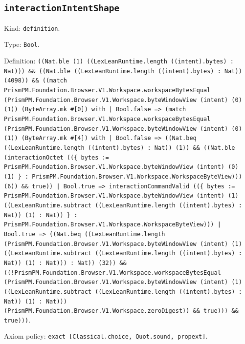 \documentclass[11pt]{article}
\begin{document}
\subsection*{\texttt{interactionIntentShape}}
\noindent Kind: \texttt{definition}.\par
\noindent Type: \texttt{Bool}.\par
\noindent Definition: \texttt{((Nat.ble (1) ((LexLeanRuntime.length ((intent).bytes) : Nat))) \&\& ((Nat.ble ((LexLeanRuntime.length ((intent).bytes) : Nat)) (4098)) \&\& ((match PrismPM.Foundation.Browser.V1.Workspace.workspaceBytesEqual (PrismPM.Foundation.Browser.V1.Workspace.byteWindowView (intent) (0) (1)) (ByteArray.mk \#[0]) with | Bool.false => (match PrismPM.Foundation.Browser.V1.Workspace.workspaceBytesEqual (PrismPM.Foundation.Browser.V1.Workspace.byteWindowView (intent) (0) (1)) (ByteArray.mk \#[4]) with | Bool.false => ((Nat.beq ((LexLeanRuntime.length ((intent).bytes) : Nat)) (1)) \&\& ((Nat.ble (interactionOctet ((\{ bytes := PrismPM.Foundation.Browser.V1.Workspace.byteWindowView (intent) (0) (1) \} : PrismPM.Foundation.Browser.V1.Workspace.WorkspaceByteView))) (6)) \&\& true)) | Bool.true => interactionCommandValid ((\{ bytes := PrismPM.Foundation.Browser.V1.Workspace.byteWindowView (intent) (1) ((LexLeanRuntime.subtract ((LexLeanRuntime.length ((intent).bytes) : Nat)) (1) : Nat)) \} : PrismPM.Foundation.Browser.V1.Workspace.WorkspaceByteView))) | Bool.true => ((Nat.beq ((LexLeanRuntime.length (PrismPM.Foundation.Browser.V1.Workspace.byteWindowView (intent) (1) ((LexLeanRuntime.subtract ((LexLeanRuntime.length ((intent).bytes) : Nat)) (1) : Nat))) : Nat)) (32)) \&\& ((!PrismPM.Foundation.Browser.V1.Workspace.workspaceBytesEqual (PrismPM.Foundation.Browser.V1.Workspace.byteWindowView (intent) (1) ((LexLeanRuntime.subtract ((LexLeanRuntime.length ((intent).bytes) : Nat)) (1) : Nat))) (PrismPM.Foundation.Browser.V1.Workspace.zeroDigest)) \&\& true))) \&\& true)))}.\par
\noindent Axiom policy: \texttt{exact [Classical.choice, Quot.sound, propext]}.\par
\end{document}
